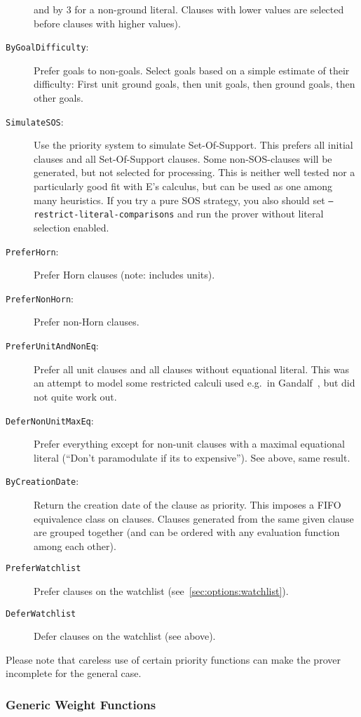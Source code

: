 \documentclass{article}
\begin{document}
\begin{description}
  and by 3 for a non-ground literal. Clauses with lower values are
  selected before clauses with higher values).
\item[\texttt{ByGoalDifficulty}:] Prefer goals to non-goals. Select
  goals based on a simple estimate of their difficulty: First unit
  ground goals, then unit goals, then ground goals, then other goals.
\item[\texttt{SimulateSOS}:] Use the priority system to simulate
  Set-Of-Support. This prefers all initial clauses and all
  Set-Of-Support clauses. Some non-SOS-clauses will be generated, but
  not selected for processing. This is neither well tested nor
  a particularly good fit with E's calculus, but can be used as one
  among many heuristics. If you try a pure SOS strategy, you also
  should set \texttt{--restrict-literal-comparisons} and run the
  prover without literal selection enabled.
\item[\texttt{PreferHorn}:] Prefer Horn clauses (note: includes units).
\item[\texttt{PreferNonHorn}:] Prefer non-Horn clauses.
\item[\texttt{PreferUnitAndNonEq}:] Prefer all unit clauses and all
  clauses without equational literal. This was an attempt to model
  some restricted calculi used e.g.~in Gandalf~\cite{Tammet:JAR-97},
  but did not quite work out.
\item[\texttt{DeferNonUnitMaxEq}:] Prefer everything except for
  non-unit clauses with a maximal equational literal (``Don't
  paramodulate if its to expensive''). See above, same result.
\item[\texttt{ByCreationDate}:] Return the creation date of the clause
  as priority. This imposes a FIFO equivalence class on
  clauses. Clauses generated from the same given clause are grouped
  together (and can be ordered with any evaluation function among each
  other).
\item[\texttt{PreferWatchlist}] Prefer clauses on the watchlist
  (see~\ref{sec:options:watchlist}).
\item[\texttt{DeferWatchlist}] Defer clauses on the watchlist (see
  above).
\end{description}

Please note that careless use of certain priority functions can make
the prover incomplete for the general case.


\subsubsection{Generic Weight Functions}
\end{document}
